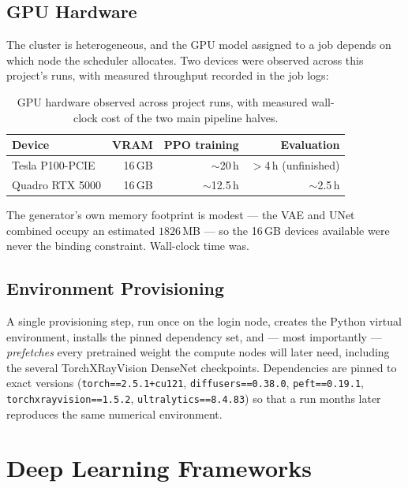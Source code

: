 \subsection{GPU Hardware}

The cluster is heterogeneous, and the GPU model assigned to a job depends
on which node the scheduler allocates. Two devices were observed across
this project's runs, with measured throughput recorded in the job logs:

\begin{table}[h]
\centering
\caption[GPU hardware and measured runtimes]{GPU hardware observed across
project runs, with measured wall-clock cost of the two main pipeline
halves.}
\label{tab:hardware}
\begin{tabular}{@{}lrrr@{}}
\toprule
\textbf{Device} & \textbf{VRAM} & \textbf{PPO training} & \textbf{Evaluation} \\
\midrule
Tesla P100-PCIE   & 16\,GB & $\sim$20\,h   & $>$4\,h (unfinished) \\
Quadro RTX 5000   & 16\,GB & $\sim$12.5\,h & $\sim$2.5\,h \\
\bottomrule
\end{tabular}
\end{table}

The generator's own memory footprint is modest --- the VAE and UNet
combined occupy an estimated $1826$\,MB --- so the 16\,GB devices
available were never the binding constraint. Wall-clock time was.

\subsection{Environment Provisioning}

A single provisioning step, run once on the login node, creates the
Python virtual environment, installs the pinned dependency set, and ---
most importantly --- \emph{prefetches} every pretrained weight the
compute nodes will later need, including the several TorchXRayVision
DenseNet checkpoints. Dependencies are pinned to exact versions
(\texttt{torch==2.5.1+cu121}, \texttt{diffusers==0.38.0},
\texttt{peft==0.19.1}, \texttt{torchxrayvision==1.5.2},
\texttt{ultralytics==8.4.83}) so that a run months later reproduces the
same numerical environment.

\section{Deep Learning Frameworks}

